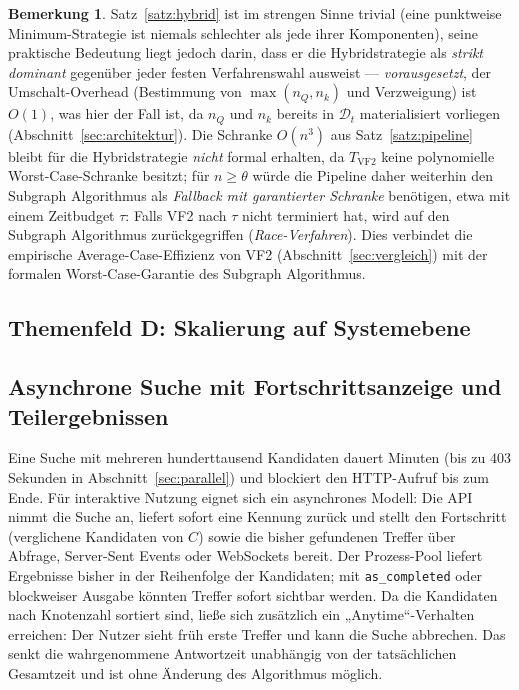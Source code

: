 \documentclass[a4paper,12pt, twoside]{report}
\theoremstyle{definition}
\newtheorem{bemerkung}{Bemerkung}
\begin{document}
\begin{bemerkung}
	Satz~\ref{satz:hybrid} ist im strengen Sinne trivial (eine punktweise Minimum-Strategie ist niemals schlechter als jede ihrer Komponenten), seine praktische Bedeutung liegt jedoch darin, dass er die Hybridstrategie als \emph{strikt dominant} gegenüber jeder festen Verfahrenswahl ausweist — \emph{vorausgesetzt}, der Umschalt-Overhead (Bestimmung von $\max(n_Q,n_k)$ und Verzweigung) ist $O(1)$, was hier der Fall ist, da $n_Q$ und $n_k$ bereits in $\mathcal{D}_t$ materialisiert vorliegen (Abschnitt~\ref{sec:architektur}). Die Schranke $O(n^3)$ aus Satz~\ref{satz:pipeline} bleibt für die Hybridstrategie \emph{nicht} formal erhalten, da $T_{\text{VF2}}$ keine polynomielle Worst-Case-Schranke besitzt; für $n\ge\theta$ würde die Pipeline daher weiterhin den Subgraph Algorithmus als \emph{Fallback mit garantierter Schranke} benötigen, etwa mit einem Zeitbudget $\tau$: Falls VF2 nach $\tau$ nicht terminiert hat, wird auf den Subgraph Algorithmus zurückgegriffen (\emph{Race-Verfahren}). Dies verbindet die empirische Average-Case-Effizienz von VF2 (Abschnitt~\ref{sec:vergleich}) mit der formalen Worst-Case-Garantie des Subgraph Algorithmus.
\end{bemerkung}


\subsection*{Themenfeld D: Skalierung auf Systemebene}

\subsection{Asynchrone Suche mit Fortschrittsanzeige und Teilergebnissen}

Eine Suche mit mehreren hunderttausend Kandidaten dauert Minuten (bis zu $403$ Sekunden in Abschnitt~\ref{sec:parallel}) und blockiert den HTTP-Aufruf bis zum Ende. Für interaktive Nutzung eignet sich ein asynchrones Modell: Die API nimmt die Suche an, liefert sofort eine Kennung zurück und stellt den Fortschritt (verglichene Kandidaten von $C$) sowie die bisher gefundenen Treffer über Abfrage, Server-Sent Events oder WebSockets bereit. Der Prozess-Pool liefert Ergebnisse bisher in der Reihenfolge der Kandidaten; mit \texttt{as\_completed} oder blockweiser Ausgabe könnten Treffer sofort sichtbar werden. Da die Kandidaten nach Knotenzahl sortiert sind, ließe sich zusätzlich ein „Anytime“-Verhalten erreichen: Der Nutzer sieht früh erste Treffer und kann die Suche abbrechen. Das senkt die wahrgenommene Antwortzeit unabhängig von der tatsächlichen Gesamtzeit und ist ohne Änderung des Algorithmus möglich.
\end{document}
